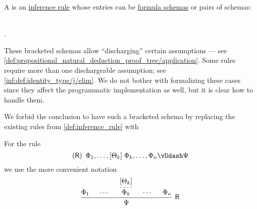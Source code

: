 \begin{definition}\label{def:natural_deduction_rule}\mimprovised
  A  is an \hyperref[def:inference_rule]{inference rule} whose entries can be \hyperref[con:schemas_and_instances]{formula schemas} or pairs of schemas:
  \begin{bnf*}
     { \bnfor} \\
    .
  \end{bnf*}

  These bracketed schemas allow \enquote{discharging} certain assumptions --- see \cref{def:propositional_natural_deduction_proof_tree/application}. Some rules require more than one dischargeable assumption; see \cref{inf:def:identity_type/j/elim}. We do not bother with formalizing these cases since they affect the programmatic implementation as well, but it is clear how to handle them.

  We forbid the conclusion to have such a bracketed schema by replacing the existing rules from \cref{def:inference_rule} with
  \begin{bnf*}
     {}
  \end{bnf*}

  For the rule
  \begin{equation*}
    (\logic{R}) \enspace \Phi_1, \ldots, [\Theta_k] \thickspace \Phi_k, \ldots, \Phi_n \vDdash \Psi
  \end{equation*}
  we use the more convenient notation
  \begin{equation*}
    \begin{prooftree}
      \hypo{ \Phi_1 }
      \hypo{ \cdots }

      \hypo{ [\Theta_k] }
      \infer[dashed]1{ \Phi_k }

      \hypo{ \cdots }
      \hypo{ \Phi_n }
      \infer5[\logic{R}]{ \Psi }
    \end{prooftree}
  \end{equation*}
\end{definition}
